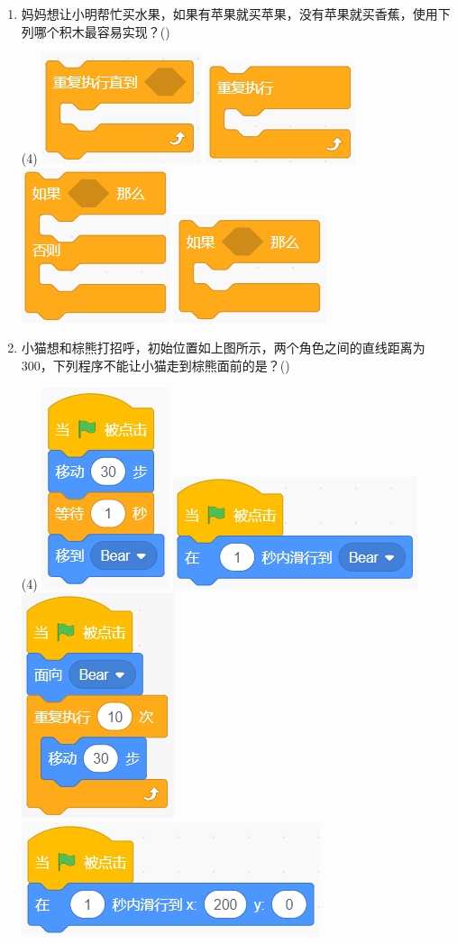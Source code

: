 \documentclass[10pt, a4paper]{article}
\newcommand{\hq}{\hfill(\qquad)}
\begin{document}
\begin{enumerate}
        \item 妈妈想让小明帮忙买水果，如果有苹果就买苹果，没有苹果就买香蕉，使用下列哪个积木最容易实现？\hq
        \begin{tasks}(4)
            \task \includegraphics[width=.18\textwidth]{figure/24a.png}
            \task \includegraphics[width=.18\textwidth]{figure/24b.png}
            \task \includegraphics[width=.115\textwidth]{figure/24c.png}
            \task \includegraphics[width=.18\textwidth]{figure/24d.png}
        \end{tasks}

        \item 小猫想和棕熊打招呼，初始位置如上图所示，两个角色之间的直线距离为300，下列程序不能让小猫走到棕熊面前的是？\hq
        \begin{tasks}(4)
            \task \includegraphics[width=.1\textwidth]{figure/25a.png}
            \task \includegraphics[width=.18\textwidth]{figure/25b.png}
            \task \includegraphics[width=.1\textwidth]{figure/25c.png}
            \task \includegraphics[width=.18\textwidth]{figure/25d.png}
        \end{tasks}
    \end{enumerate}
\end{document}
